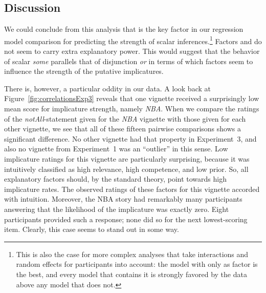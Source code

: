 \documentclass[12pt]{article}
\begin{document}
\subsection{Discussion}

We could conclude from this analysis that \pri is the key factor in our regression model
comparison for predicting the strength of scalar inferences.\footnote{This is also the case for
  more complex analyses that take interactions and random effects for participants into
  account: the model with only \pri as factor is the best, and every model that contains it is
  strongly favored by the data above any model that does not.} Factors \rel and \com do not
seem to carry extra explanatory power. This would suggest that the behavior of scalar
\emph{some} parallels that of disjunction \emph{or} in terms of which factors seem to influence
the strength of the putative implicatures. 

There is, however, a particular oddity in our data. A look back at
Figure~\ref{fig:correlationsExp3} reveals that one vignette received a surprisingly low mean
score for implicature strength, namely \emph{NBA}. When we compare the ratings of the
\emph{notAll}-statement given for the \emph{NBA} vignette with those given for each other
vignette, we see that all of these fifteen pairwise comparisons shows a significant
difference. No other vignette had that property in Experiment~3, and also no vignette from
Experiment~1 was an ``outlier'' in this sense. Low implicature ratings for this vignette are
particularly surprising, because it was intuitively classified as high relevance, high
competence, and low prior. So, all explanatory factors should, by the standard theory, point
towards high implicature rates. The observed ratings of these factors for this vignette
accorded with intuition. Moreover, the NBA story had remarkably many participants answering
that the likelihood of the implicature was exactly zero. Eight participants provided such a
response; none did so for the next lowest-scoring item. Clearly, this case seems to stand out
in some way.

\end{document}
